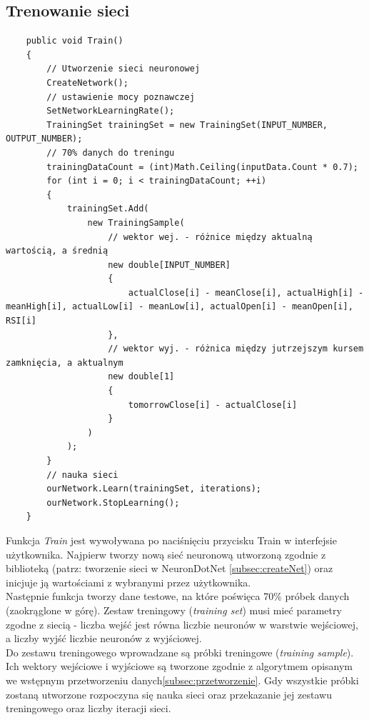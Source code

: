 \documentclass[a4paper]{article}
\begin{document}
	\subsection{Trenowanie sieci}\label{subsec:train}
	\begin{lstlisting}
	public void Train()
	{
		// Utworzenie sieci neuronowej
		CreateNetwork();
		// ustawienie mocy poznawczej
		SetNetworkLearningRate();
		TrainingSet trainingSet = new TrainingSet(INPUT_NUMBER, OUTPUT_NUMBER);
		// 70% danych do treningu
		trainingDataCount = (int)Math.Ceiling(inputData.Count * 0.7);
		for (int i = 0; i < trainingDataCount; ++i)
		{
			trainingSet.Add(
				new TrainingSample(
					// wektor wej. - różnice między aktualną wartością, a średnią
					new double[INPUT_NUMBER]
					{
						actualClose[i] - meanClose[i], actualHigh[i] - meanHigh[i], actualLow[i] - meanLow[i], actualOpen[i] - meanOpen[i], RSI[i]
					},
					// wektor wyj. - różnica między jutrzejszym kursem zamknięcia, a aktualnym
					new double[1]
					{
						tomorrowClose[i] - actualClose[i]
					}
				)
			);
		}
		// nauka sieci
		ourNetwork.Learn(trainingSet, iterations);
		ourNetwork.StopLearning();
	}
	\end{lstlisting}\indent\indent
	Funkcja \textit{Train} jest wywoływana po naciśnięciu przycisku Train w interfejsie użytkownika.  Najpierw tworzy nową sieć neuronową utworzoną zgodnie z biblioteką (patrz: tworzenie sieci w NeuronDotNet \ref{subsec:createNet}) oraz inicjuje ją wartościami z wybranymi przez użytkownika.\\\indent
	Następnie funkcja tworzy dane testowe, na które poświęca 70\% próbek danych (zaokrąglone w górę). Zestaw treningowy (\emph{training set}) musi mieć parametry zgodne z siecią - liczba wejść jest równa liczbie neuronów w warstwie wejściowej, a liczby wyjść liczbie neuronów z wyjściowej.\\\indent
	Do zestawu treningowego wprowadzane są próbki treningowe (\emph{training sample}). Ich wektory wejściowe i wyjściowe są tworzone zgodnie z algorytmem opisanym we wstępnym przetworzeniu danych\ref{subsec:przetworzenie}. Gdy wszystkie próbki zostaną utworzone rozpoczyna się nauka sieci oraz przekazanie jej zestawu treningowego oraz liczby iteracji sieci.
\end{document}
